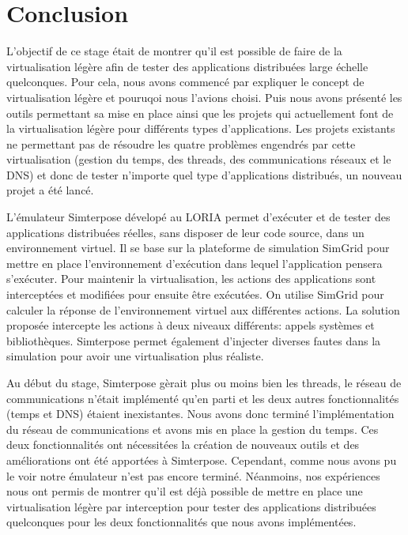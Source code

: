 \section{Conclusion}
\label{section:ccl}

L'objectif de ce stage était de montrer qu'il est possible de faire de la
virtualisation légère afin de tester des applications distribuées large échelle
quelconques. Pour cela, nous avons commencé par expliquer le concept de
virtualisation légère et pouruqoi nous l'avions choisi. Puis nous avons présenté
les outils permettant sa mise en place ainsi que les projets qui actuellement
font de la virtualisation légère pour différents types d'applications. Les
projets existants ne permettant pas de résoudre les quatre problèmes engendrés
par cette virtualisation (gestion du temps, des threads, des communications
réseaux et le DNS) et donc de tester n'importe quel type d'applications
distribués, un nouveau projet a été lancé.

L'émulateur Simterpose dévelopé au LORIA permet d'exécuter et de tester des
applications distribuées réelles, sans disposer de leur code source, dans un
environnement virtuel. Il se base sur la plateforme de simulation SimGrid pour
mettre en place l'environnement d'exécution dans lequel l'application pensera
s'exécuter. Pour maintenir la virtualisation, les actions des applications sont
interceptées et modifiées pour ensuite être exécutées. On utilise SimGrid pour
calculer la réponse de l'environnement virtuel aux différentes actions. La
solution proposée intercepte les actions à deux niveaux différents: appels
systèmes et bibliothèques. Simterpose permet également d'injecter diverses
fautes dans la simulation pour avoir une virtualisation plus réaliste.

Au début du stage, Simterpose gèrait plus ou moins bien les threads, le réseau
de communications n'était implémenté qu'en parti et les deux autres
fonctionnalités (temps et DNS) étaient inexistantes. Nous avons donc terminé
l'implémentation du réseau de communications et avons mis en place la gestion du
temps. Ces deux fonctionnalités ont nécessitées la création de nouveaux outils
et des améliorations ont été apportées à Simterpose. Cependant, comme nous avons
pu le voir notre émulateur n'est pas encore terminé. Néanmoins, nos expériences
nous ont permis de montrer qu'il est déjà possible de mettre en place une
virtualisation légère par interception pour tester des applications distribuées
quelconques pour les deux fonctionnalités que nous avons implémentées.
